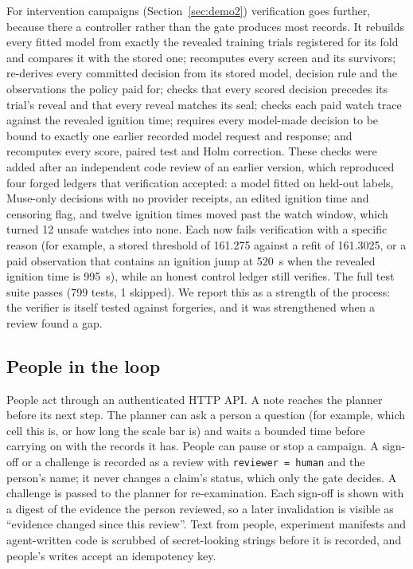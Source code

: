 \documentclass[11pt]{article}
\begin{document}
For intervention campaigns (Section~\ref{sec:demo2}) verification goes further, because there a controller rather
than the gate produces most records. It rebuilds every fitted model from exactly the revealed training trials
registered for its fold and compares it with the stored one; recomputes every screen and its survivors; re-derives
every committed decision from its stored model, decision rule and the observations the policy paid for; checks that
every scored decision precedes its trial's reveal and that every reveal matches its seal; checks each paid watch trace
against the revealed ignition time; requires every model-made decision to be bound to exactly one earlier recorded
model request and response; and recomputes every score, paired test and Holm correction. These checks were added after
an independent code review of an earlier version, which reproduced four forged ledgers that verification accepted: a
model fitted on held-out labels, Muse-only decisions with no provider receipts, an edited ignition time and censoring
flag, and twelve ignition times moved past the watch window, which turned 12 unsafe watches into none. Each now fails
verification with a specific reason (for example, a stored threshold of 161.275 against a refit of 161.3025, or a paid
observation that contains an ignition jump at 520~s when the revealed ignition time is 995~s), while an honest control
ledger still verifies. The full test suite passes (799 tests, 1 skipped). We report this as a strength of the process: the
verifier is itself tested against forgeries, and it was strengthened when a review found a gap.

\subsection{People in the loop}
People act through an authenticated HTTP API. A note reaches the planner before its next step. The planner can ask a
person a question (for example, which cell this is, or how long the scale bar is) and waits a bounded time before
carrying on with the records it has. People can pause or stop a campaign. A sign-off or a challenge is recorded as a
review with \texttt{reviewer = human} and the person's name; it never changes a claim's status, which only the gate
decides. A challenge is passed to the planner for re-examination. Each sign-off is shown with a digest of the
evidence the person reviewed, so a later invalidation is visible as ``evidence changed since this review''. Text from
people, experiment manifests and agent-written code is scrubbed of secret-looking strings before it is recorded, and
people's writes accept an idempotency key.
\end{document}

